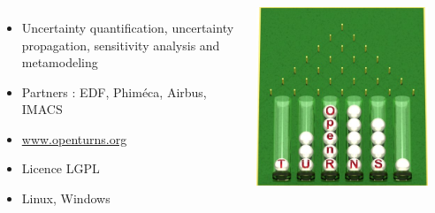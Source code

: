 \documentclass{beamer}
\begin{document}
\begin{frame}
\frametitle{\ot{}}

  \begin{columns}
	
\begin{itemize}
\item Uncertainty quantification, uncertainty propagation, sensitivity analysis and metamodeling
\item Partners : EDF, Phiméca, Airbus, IMACS
\item \url{www.openturns.org}
\item Licence LGPL 
\item Linux, Windows
\end{itemize}


	\begin{center}
\includegraphics[width=0.9\textwidth]{figures/logo-ot}
\end{center}

	\end{columns}
\end{frame}

\end{document}
